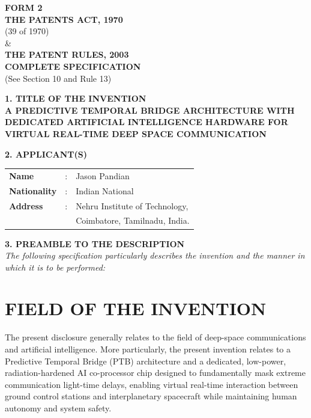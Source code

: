 \documentclass[12pt,a4paper]{article}
\begin{document}
\begin{center}
    \textbf{\large FORM 2} \\
    \vspace{0.3cm}
    \textbf{THE PATENTS ACT, 1970} \\
    (39 of 1970) \\
    \& \\
    \textbf{THE PATENT RULES, 2003} \\
    \vspace{0.5cm}
    \textbf{\large COMPLETE SPECIFICATION} \\
    (See Section 10 and Rule 13) \\
    \vspace{1cm}
    
    \textbf{\Large 1. TITLE OF THE INVENTION} \\
    \vspace{0.5cm}
    \textbf{\large A PREDICTIVE TEMPORAL BRIDGE ARCHITECTURE WITH DEDICATED ARTIFICIAL INTELLIGENCE HARDWARE FOR VIRTUAL REAL-TIME DEEP SPACE COMMUNICATION} \\
    \vspace{1.5cm}
    
    \textbf{\Large 2. APPLICANT(S)} \\
    \vspace{0.5cm}
    \begin{tabular}{lll}
        \textbf{Name} & : & Jason Pandian \\
        \textbf{Nationality} & : & Indian National \\
        \textbf{Address} & : & Nehru Institute of Technology, \\
                         &   & Coimbatore, Tamilnadu, India. \\
    \end{tabular}
    \vspace{1.5cm}
    
    \textbf{\Large 3. PREAMBLE TO THE DESCRIPTION} \\
    \vspace{0.5cm}
    \textit{The following specification particularly describes the invention and the manner in which it is to be performed:}
\end{center}

\newpage

\section*{FIELD OF THE INVENTION}
The present disclosure generally relates to the field of deep-space communications and artificial intelligence. More particularly, the present invention relates to a Predictive Temporal Bridge (PTB) architecture and a dedicated, low-power, radiation-hardened AI co-processor chip designed to fundamentally mask extreme communication light-time delays, enabling virtual real-time interaction between ground control stations and interplanetary spacecraft while maintaining human autonomy and system safety.
\end{document}
